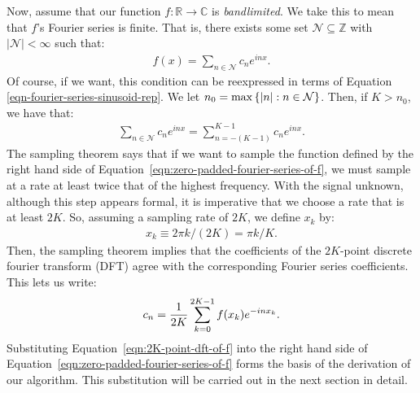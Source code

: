 Now, assume that our function $f : \mathbb{R} \to \mathbb{C}$
is \emph{bandlimited}. We take this to mean that $f$'s
Fourier series is finite. That is, there exists some set
$\mathcal{N} \subseteq \mathbb{Z}$
with $|\mathcal{N}| < \infty$ such that:
\begin{align*}
  f(x) = \sum_{n \in \mathcal{N}} c_n e^{inx}.
\end{align*}
Of course, if we want, this condition can be reexpressed in terms of
Equation \ref{eqn-fourier-series-sinusoid-rep}.  We let
$n_0 = \max \left\{\left|n\right| : n \in \mathcal{N}\right\}$. Then, if $K > n_0$, we
have that:
\begin{align} \label{eqn:zero-padded-fourier-series-of-f}
  \sum_{n \in \mathcal{N}} c_n e^{inx} = \sum_{n=-(K-1)}^{K-1} c_ne^{inx}.
\end{align}
The sampling theorem says that if we want to sample the function
defined by the right hand side of
Equation~\ref{eqn:zero-padded-fourier-series-of-f}, we must sample at
a rate at least twice that of the highest frequency. With the signal
unknown, although this step appears formal, it is imperative that we
choose a rate that is at least $2K$. So, assuming a sampling rate of
$2K$, we define $x_k$ by:
\begin{align*}
  x_k \equiv 2\pi k /(2K) = \pi k / K.
\end{align*}
Then, the sampling theorem implies that the coefficients of the
$2K$-point discrete fourier transform (DFT) agree with the
corresponding Fourier series coefficients. This lets us write:
\begin{align} \label{eqn:2K-point-dft-of-f}
  c_n = {1 \over 2K} \sum_{k=0}^{2K-1} f(x_k) e^{-inx_k}.
\end{align}
Substituting Equation~\ref{eqn:2K-point-dft-of-f} into the right hand
side of Equation~\ref{eqn:zero-padded-fourier-series-of-f} forms the
basis of the derivation of our algorithm. This substitution will be
carried out in the next section in detail.
